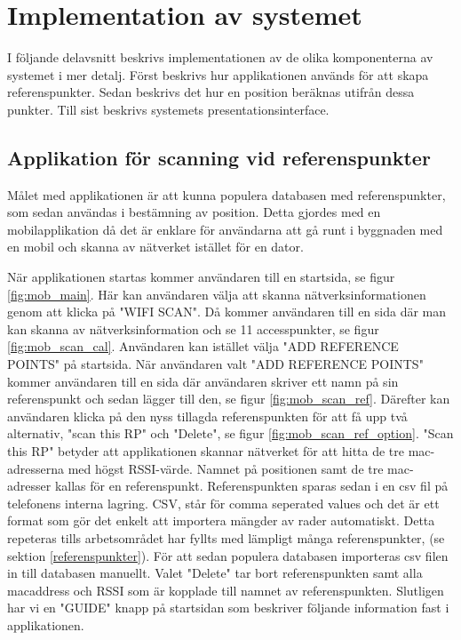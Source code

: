 \documentclass[swedish, a4paper,12pt]{article}
\begin{document}
\section{Implementation av systemet}
I följande delavsnitt beskrivs implementationen av de olika komponenterna av systemet i mer detalj. Först beskrivs hur applikationen används för att skapa referenspunkter. Sedan beskrivs det hur en position beräknas utifrån dessa punkter. Till sist beskrivs systemets presentationsinterface.

\subsection{Applikation för scanning vid referenspunkter}
Målet med applikationen är att kunna populera databasen med referenspunkter, som sedan användas i bestämning av position. Detta gjordes med en mobilapplikation då det är enklare för användarna att gå runt i byggnaden med en mobil och skanna av nätverket istället för en dator.

När applikationen startas kommer användaren till en startsida, se figur \ref{fig:mob_main}. Här kan användaren välja att skanna nätverksinformationen genom att klicka på "WIFI SCAN". Då kommer användaren till en sida där man kan skanna av nätverksinformation och se 11 accesspunkter, se figur \ref{fig:mob_scan_cal}. Användaren kan istället välja "ADD REFERENCE POINTS" på startsida. När användaren valt "ADD REFERENCE POINTS" kommer användaren till en sida där användaren skriver ett namn på sin referenspunkt och sedan lägger till den, se figur \ref{fig:mob_scan_ref}. Därefter kan användaren klicka på den nyss tillagda referenspunkten för att få upp två alternativ, "scan this RP" och "Delete", se figur \ref{fig:mob_scan_ref_option}. "Scan this RP" betyder att applikationen skannar nätverket för att hitta de tre mac-adresserna med högst RSSI-värde. Namnet på positionen samt de tre mac-adresser kallas för en referenspunkt. Referenspunkten sparas sedan i en csv fil på telefonens interna lagring. CSV, står för comma seperated values och det är ett format som gör det enkelt att importera mängder av rader automatiskt. Detta repeteras tills arbetsområdet har fyllts med lämpligt många referenspunkter, (se sektion \ref{referenspunkter}). För att sedan populera databasen importeras csv filen in till databasen manuellt. Valet "Delete" tar bort referenspunkten samt alla macaddress och RSSI som är kopplade till namnet av referenspunkten. Slutligen har vi en "GUIDE" knapp på startsidan som beskriver följande information fast i applikationen.
\end{document}
